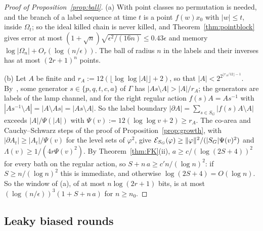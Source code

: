 \begin{proof}[Proof of Proposition~\ref{prop:ball}]
(a) With point classes no permutation is needed, and the branch of a label sequence at time $t$ is a point $f(w)x_0$ with $|w|\le t$, inside $\Omega_t$; so the ideal killed
chain is never killed, and Theorem~\ref{thm:pointblock} gives error at most $(1+\sqrt n)\sqrt{\epsilon^2/(16n)}\le0.43\epsilon$ and memory
$\log|\Omega_n|+O_r(\log(n/\epsilon))$. The ball of radius $n$ in the labels and their inverses has at most $(2r+1)^n$ points.

(b) Let $A$ be finite and $r_A:=12(\lfloor\log\log|A|\rfloor+2)$, so that $|A|<2^{2^{\lfloor r_A/12\rfloor-1}}$. By~\cite[Proposition~7.3]{DouglasMghirbiC}, some generator
$s\in\{p,q,t,c,a\}$ of $\Gamma$ has $|As\setminus A|>|A|/r_A$; the generators are labels of the lamp channel, and for the right regular action $f(s)A=As^{-1}$ with
$|As^{-1}\setminus A|=|A\setminus As|=|As\setminus A|$. So the label boundary $|\partial A|=\sum_{s\in S_G}|f(s)A\setminus A|$ exceeds $|A|/\Psi(|A|)$ with
$\Psi(v):=12(\log\log v+2)\ge r_A$. The co-area and Cauchy--Schwarz steps of the proof of Proposition~\ref{prop:growth}, with $|\partial A_t|\ge|A_t|/\Psi(v)$ for the level sets of
$\varphi^2$, give $\mathcal E_{S_G}(\varphi)\ge\lVert \varphi\rVert^2/(|S_G|\Psi(v)^2)$ and $\Lambda(v)\ge1/(4r\Psi(v)^2)$. By Theorem~\ref{thm:FK}(ii), $a\ge c/(\log(2S+4))^2$ for every bath on
the regular action, so $S+n\,a\ge c'n/(\log n)^2$: if $S\ge n/(\log n)^2$ this is immediate, and otherwise $\log(2S+4)=O(\log n)$. So the window of (a), of at most $n\log(2r+1)$
bits, is at most $(\log(n/\epsilon))^3(1+S+n\,a)$ for $n\ge n_0$.
\end{proof}

\subsection{Leaky biased rounds}

